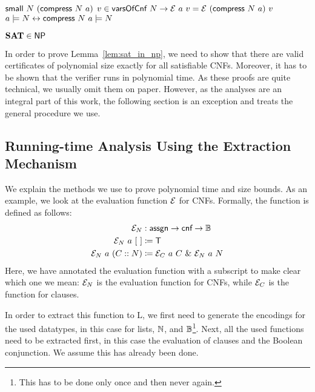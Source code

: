 \begin{lemma}\leavevmode
  \begin{enumerate}
     $\textsf{small}~N~(\textsf{compress}~N~a)$
     $v \in \textsf{varsOfCnf}~N \rightarrow \mathcal{E}~a~v = \mathcal{E}~(\textsf{compress}~N~a)~v$
     $a \models N \leftrightarrow \textsf{compress}~N~a \models N$
  \end{enumerate}
\end{lemma}

\begin{lemma}[\SAT{} is in \NP{}][sat_NP]\label{lem:sat_in_np}
  $\textbf{SAT}{} \in \normalfont{\textsf{NP}{}}$
\end{lemma}

In order to prove Lemma~\ref{lem:sat_in_np}, we need to show that there are valid certificates of polynomial size exactly for all satisfiable CNFs. 
Moreover, it has to be shown that the verifier runs in polynomial time. 
As these proofs are quite technical, we usually omit them on paper. However, as the analyses are an integral part of this work, the following section is an exception and treats the general procedure we use.

\subsection{Running-time Analysis Using the Extraction Mechanism}
  We explain the methods we use to prove polynomial time and size bounds. 
  As an example, we look at the evaluation function $\mathcal{E}$ for CNFs. 
  Formally, the function is defined as follows:
  \begin{align*}
    \mathcal{E}_N &: \textsf{assgn} \rightarrow \textsf{cnf} \rightarrow \mathbb{B} \\
    \mathcal{E}_N~a~[~] &\coloneqq \mathsf{T} \\
    \mathcal{E}_N~a~(C::N) &\coloneqq \mathcal{E}_C~a~C~\&~\mathcal{E}_N~a~N
  \end{align*}
  Here, we have annotated the evaluation function with a subscript to make clear which one we mean: $\mathcal{E}_N$ is the evaluation function for CNFs, while $\mathcal{E}_C$ is the function for clauses.

  In order to extract this function to L, we first need to generate the encodings for the used datatypes, in this case for lists, $\mathbb{N}$, and $\mathbb{B}$\footnote{This has to be done only once and then never again.}. 
  Next, all the used functions need to be extracted first, in this case the evaluation of clauses and the Boolean conjunction. We assume this has already been done. 

